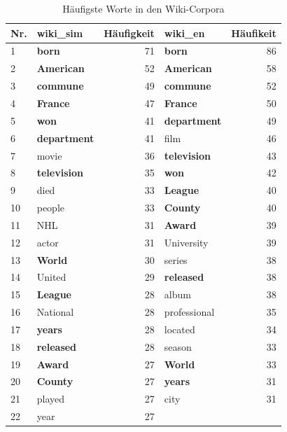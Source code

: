 \documentclass[11pt, a4paper]{article}
\begin{document}
\begin{table}
    \begin{tabular}{l*{2}{lr}}
    \toprule
    Nr. & wiki\_sim & Häufigkeit & wiki\_en & Häufikeit\\
    \midrule
     1 & \textbf{born}       & 71 & \textbf{born}         & 86\\
     2 & \textbf{American}   & 52 & \textbf{American}     & 58\\
     3 & \textbf{commune}    & 49 & \textbf{commune}      & 52\\
     4 & \textbf{France}     & 47 & \textbf{France}       & 50\\
     5 & \textbf{won}        & 41 & \textbf{department}   & 49\\
     6 & \textbf{department} & 41 & film                  & 46\\
     7 & movie               & 36 & \textbf{television}   & 43\\
     8 & \textbf{television} & 35 & \textbf{won}          & 42\\
     9 & died                & 33 & \textbf{League}       & 40\\
    10 & people              & 33 & \textbf{County}       & 40\\
    11 & NHL                 & 31 & \textbf{Award}        & 39\\
    12 & actor               & 31 & University            & 39\\
    13 & \textbf{World}      & 30 & series                & 38\\
    14 & United              & 29 & \textbf{released}     & 38\\
    15 & \textbf{League}     & 28 & album                 & 38\\
    16 & National            & 28 & professional          & 35\\
    17 & \textbf{years}      & 28 & located               & 34\\
    18 & \textbf{released}   & 28 & season                & 33\\
    19 & \textbf{Award}      & 27 & \textbf{World}        & 33\\
    20 & \textbf{County}     & 27 & \textbf{years}        & 31\\
    21 & played              & 27 & city                  & 31\\
    22 & year                & 27 &                       & \\
    \bottomrule
    \end{tabular}
    \caption{Häufigste Worte in den Wiki-Corpora}
    \label{words-wiki}
\end{table}
\end{document}
